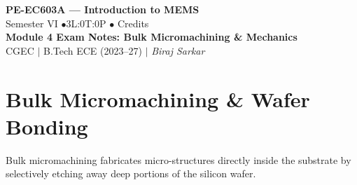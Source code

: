 \documentclass[12pt,a4paper]{article}
\begin{document}

\begin{center}
  {\LARGE\bfseries\color{myred} PE-EC603A --- Introduction to MEMS}\\[5pt]
  {\normalsize\color{mydark} Semester VI \quad$\bullet$\quad 3L:0T:0P \quad$\bullet$ Credits}\\[3pt]
  {\normalsize\color{myteal}\textbf{Module 4 Exam Notes: Bulk Micromachining \& Mechanics}}\\[3pt]
  {\small\color{mydark} CGEC \;$|$\; B.Tech ECE (2023--27) \;$|$\; \textit{Biraj Sarkar}}
\end{center}
\vspace{2pt}
\noindent{\color{myred}\rule{\linewidth}{1.5pt}}
\vspace{2pt}

\hypersetup{linkcolor=mydark}
\tableofcontents
\hypersetup{linkcolor=myteal}
\newpage

\section{Bulk Micromachining \& Wafer Bonding}

Bulk micromachining fabricates micro-structures directly inside the substrate by selectively etching away deep portions of the silicon wafer.
\end{document}
